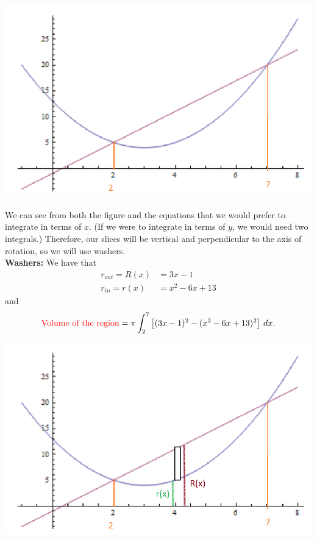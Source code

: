 \documentclass[noinstructornotes]{ximera}
\begin{document}
\begin{problem}
\begin{enumerate}
\begin{freeResponse}
		\begin{image}
		\includegraphics[scale=0.6]{Figure6-4-1new.png}
		\end{image}
		
		We can see from both the figure and the equations that we would prefer to integrate in terms of $x$.  (If we were to integrate in terms of $y$, we would need two integrals.)  Therefore, our slices will be vertical and perpendicular to the axis of rotation, so we will use washers.\\

		{\bf Washers: }  
		We have that
			\begin{align*}
			r_{out} = R(x) &= 3x-1 \\
			r_{in} = r(x) &= x^2 - 6x +13
			\end{align*}
		and
			\[
			\text{{\color{red} Volume of the region}} = \pi \int_2^7 \left[ (3x-1)^2 - (x^2-6x+13)^2 \right] \,d x.
			\]
			
		\begin{image}
		\includegraphics[scale=0.6]{Figure6-4-3new.png}
		\end{image}
		

\end{freeResponse}
\end{enumerate}
\end{problem}
\end{document}
